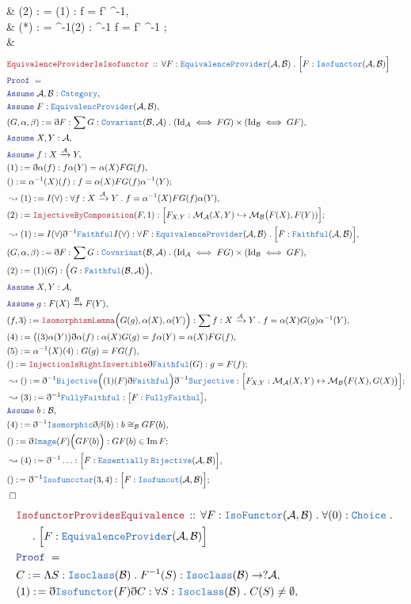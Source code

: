 \documentclass[12pt]{scrartcl}
\newcommand{\TYPE}[1]{\textcolor{NavyBlue}{\mathtt{#1}}}
\newcommand{\LOGIC}[1]{\textcolor{Blue}{\mathtt{#1}}}
\newcommand{\THM}[1]{\textcolor{Maroon}{\mathtt{#1}}}
\renewcommand{\.}{\; . \;}
\newcommand{\de}{: \kern 0.1pc =}
\newcommand{\Theorem}[2]{& \THM{#1} \, :: \, #2 \\ & \Proof = \\ }
\newcommand{\NewLine}{\\ & \kern 1pc}
\newcommand{\Page}[1]{ \begin{align*} #1 \end{align*}   }
\newcommand{ \bd }{ \ByDef }
\DeclareMathOperator*{\im}{Im}
\newcommand{\Cat}{\TYPE{Category}}
\newcommand{\Mor}{\mathcal{M}}
\newcommand{\ToInj}{\hookrightarrow}
\newcommand{\ToBij}{\leftrightarrow}
\newcommand{\Arrow}{\xrightarrow}
\newcommand{\Say}[3]{& #1 \de #2 : #3, \\}
\newcommand{\Conclude}[3]{& #1 \de #2 : #3; \\}
\newcommand{\Derive}[3]{& \leadsto #1 \de #2 : #3, \\}
\newcommand{\DeriveConclude}[3]{& \leadsto #1 \de #2 : #3 ; \\}
\newcommand{\Assume}[2]{& \LOGIC{Assume} \; #1 : #2, \\}
\newcommand{\QED}{\; \square}
\newcommand{\EndProof}{& \QED \\}
\newcommand{\ByDef}{\eth}
\newcommand{\Proof}{\LOGIC{Proof} \; }
\newcommand{\Cov}{\TYPE{Covariant}}
\newcommand{\A}{\mathcal{A}}
\newcommand{\B}{\mathcal{B}}
\begin{document}
{	\Say{(2)}{ (1) \psi }{ f = \varphi f' \psi^{-1}}
	\Conclude{(*)}{  \varphi^{-1}(2)   }{ \varphi^{-1} f = f' \psi^{-1}  }
	\EndProof
 } \Page{
	 \Theorem{ EquivalenceProviderIsIsofunctor  }{ \forall F : \TYPE{EquivalenceProvider}(\A,\B) \. 
	 	\Big[ F : \TYPE{Isofunctor}(\A,\B)  \Big]
	 }
 	 \Assume{\A,\B}{\Cat}
	 \Assume{F}{\TYPE{EquivalencProvider}(\A,\B)}
	 \Say{(G,\alpha,\beta)}{\bd F}{\sum G : \Cov(\B,\A) \. (\mathrm{Id}_\A \iff FG) \times (\mathrm{Id}_\B \iff GF)}
	 \Assume{X,Y}{\A}
	 \Assume{f}{X \Arrow{\A} Y}
	 \Say{(1)}{\bd \alpha (f)}{   f \alpha(Y)  =  \alpha(X) FG(f)   }
	 \Conclude{()}{ \alpha^{-1}(X)(f)  }{ f = \alpha(X) FG(f) \alpha^{-1}(Y) }
	 \Derive{(1)}{I(\forall)}{\forall f : X \Arrow{\A} Y \. f = \alpha^{-1}(X) FG(f) \alpha(Y) }
	 \Conclude{(2)}{\THM{InjectiveByComposition}(F,1)}{ \Big[ F_{X,Y} : \Mor_\A(X,Y) \ToInj  \Mor_\B\big(F(X),F(Y))  \Big]  }
	 \Derive{(1)}{I(\forall)\bd^{-1}\TYPE{Faithful}I(\forall)}
	 { \forall F : \TYPE{EquivalenceProvider}(\A,\B) \. \Big[  F : \TYPE{Faithful}(\A,\B) \Big]}
	 \Say{(G,\alpha,\beta)}{\bd F}{\sum G : \Cov(\B,\A) \. (\mathrm{Id}_\A \iff FG) \times (\mathrm{Id}_\B \iff GF)}
	 \Say{(2)}{ (1)( G ) }{ \Big( G : \TYPE{Faithful}(\B,\A) \Big)}
	 \Assume{X,Y}{\A}
	 \Assume{g}{ F(X) \Arrow{\B} F(Y) }
	 \Say{(f,3)}{\THM{IsomorphismLemma}\Big(G(g),\alpha(X),\alpha(Y)\Big)}
	 {\sum f : X \Arrow{\A} Y \. f = \alpha(X)G(g)\alpha^{-1}(Y)}
	 \Say{(4)}{ \big((3)\alpha(Y)\big)\bd\alpha(f)}{  \alpha(X)G(g) =  f\alpha(Y) = \alpha(X)FG(f) }
	 \Say{(5)}{ \alpha^{-1}(X)(4) }{ G(g) = FG(f)}
	 \Conclude{()}{\THM{InjectionIsRightInvertible}\bd \TYPE{Faithful}(G)}{ g = F(f)}
	 \DeriveConclude{()}{\bd^{-1} \TYPE{Bijective} \Big((1)(F)\bd \TYPE{Faithful}\Big)\bd^{-1}\TYPE{Surjective}}
	 { \Big[ F_{X,Y} : \Mor_\A(X,Y) \ToBij \Mor_\B\big(F(X),G(X)\big)  \Big] }
	 \Derive{(3)}{\bd^{-1}\TYPE{FullyFaithful}}{\big[F : \TYPE{FullyFaithul} \big]}
	 \Assume{b}{\B}
	 \Say{(4)}{\bd^{-1}\TYPE{Isomorphic}\bd \beta(b)}{b \cong_\B GF(b)}
	 \Conclude{()}{\bd \TYPE{Image}(F)\Big(GF(b)\Big)}{ GF(b) \in \im F}
	 \Derive{(4)}{\bd^{-1} \ldots}{ \Big[  F : \TYPE{Essentially} \; \TYPE{Bijective}(\A,\B) \Big]  }
	 \Conclude{()}{\bd^{-1} \TYPE{Isofuncctor}(3,4)}{\Big[ F : \TYPE{Isofuncot}(\A,\B) \Big]}
	 \EndProof
}\Page{
	\Theorem{ IsofunctorProvidesEquivalence }{ \forall F : \TYPE{IsoFunctor}(\A,\B) \. \forall (0) : \TYPE{Choice} 
		\. \NewLine \. \Big[ F : \TYPE{EquivalenceProvider}(\A,\B) \Big]}
	\Say{C}{\Lambda S : \TYPE{Isoclass}(\B) \. F^{-1}(S)}{ \TYPE{Isoclass}(\B) \to ?\A  }
	\Say{(1)}{\bd \TYPE{Isofunctor}(F)\bd C}{\forall S : \TYPE{Isoclass}(\B) \. C(S) \neq \emptyset}
}
\end{document}
